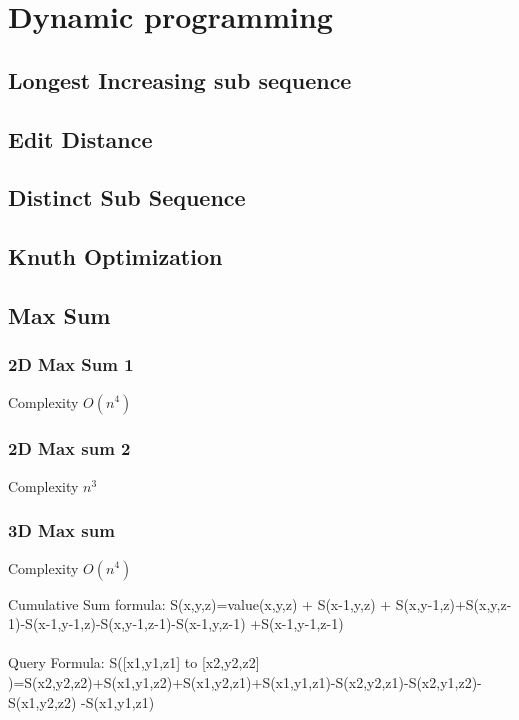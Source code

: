\documentclass[11pt]{report}
\begin{document}
\chapter{Dynamic programming}
\section{Longest Increasing sub sequence}

\section{Edit Distance}

\section{Distinct Sub Sequence}

\section{Knuth Optimization}

\section{Max Sum}
\subsection{2D Max Sum 1}
Complexity $O(n^4)$

\subsection{2D Max sum 2}
Complexity $n^3$

\subsection{3D Max sum}
Complexity $O(n^4)$

Cumulative Sum formula: S(x,y,z)=value(x,y,z) + S(x-1,y,z) + S(x,y-1,z)+S(x,y,z-1)-S(x-1,y-1,z)-S(x,y-1,z-1)-S(x-1,y,z-1)
+S(x-1,y-1,z-1)\\ \\
Query Formula: S([x1,y1,z1] to [x2,y2,z2] )=S(x2,y2,z2)+S(x1,y1,z2)+S(x1,y2,z1)+S(x1,y1,z1)-S(x2,y2,z1)-S(x2,y1,z2)-S(x1,y2,z2)
-S(x1,y1,z1) \\ \\ 
\end{document}
